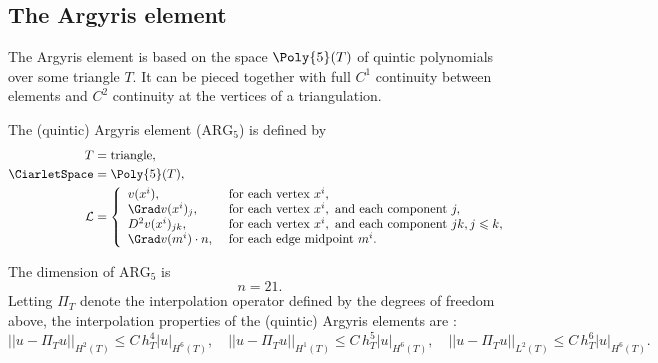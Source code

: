 \subsection{The Argyris element}

The Argyris element \citep{ArgyrisFriedScharpf1968,Ciarlet2002} is
based on the space $\Poly{5}(T)$ of quintic polynomials over some triangle
$T$.  It can be pieced together with full $C^1$ continuity between
elements and $C^2$ continuity at the vertices of a triangulation.

\begin{definition}
  The (quintic) Argyris element ($\mathrm{ARG}_5$) is defined by
  \begin{align}
    T &= \mathrm{triangle}, \\
    \CiarletSpace &= \Poly{5}(T), \\
    \mathcal{L} &=
    \left \{
    \begin{array}{ll}
      v(x^i),
      &\text{ for each vertex } x^i, \\
      \Grad v(x^i)_j,
      &\text{ for each vertex } x^i, \text{ and each component } j, \\
      D^2 v(x^i)_{jk},
      &\text{ for each vertex } x^i, \text{ and each component } jk, j \leqslant k, \\
      \Grad v(m^i) \cdot n,
      &\text{ for each edge midpoint } m^i. \\
    \end{array}
    \right .
  \end{align}
\end{definition}
The dimension of $\mathrm{ARG}_5$ is
\begin{equation}
  n = 21.
\end{equation}
Letting $\Pi_T$ denote the interpolation operator defined by the
degrees of freedom above, the interpolation properties of the
(quintic) Argyris elements are \citep[Chapter II.6]{Braess2007}:
\begin{equation}
  ||u - \Pi_T u||_{H^2(T)} \leqslant C \, h_T^{4} |u|_{H^6(T)}, \quad
  ||u - \Pi_T u||_{H^1(T)} \leqslant C \, h_T^{5} |u|_{H^6(T)}, \quad
  ||u - \Pi_T u||_{L^2(T)} \leqslant C \, h_T^{6} |u|_{H^6(T)}.
\end{equation}

